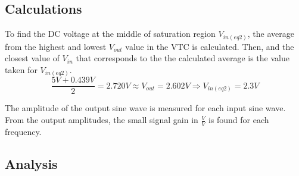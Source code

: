 \subsection{Calculations}

\FloatBarrier

\begin{table}[h!]
	\centering
	\caption{Figure (\ref{fig:part2_vtc}) Data}
	\label{tab:part2_vtc}
\end{table}

\FloatBarrier

To find the DC voltage at the middle of saturation region $V_{in(eq2)}$, the average from the highest and lowest $V_{out}$ value in the VTC is calculated.
Then, and the closest value of $V_{in}$ that corresponds to the the calculated average is the value taken for $V_{in(eq2)}$. \\

\begin{equation}
	\label{eq:v_in_eq2}
	\frac{5 V + 0.439 V}{2} = 2.720 V \approx V_{out} = 2.602 V \Rightarrow V_{in(eq2)} = 2.3 V
\end{equation}

The amplitude of the output sine wave is measured for each input sine wave. 
From the output amplitudes, the small signal gain in $\frac{V}{V}$ is found for each frequency.

\FloatBarrier

\begin{table}[h!]
	\centering
	\caption{Gain of Common Source Amplifier}
	\label{tab:gain_part2}
\end{table}

\FloatBarrier

\begin{table}[h!]
	\centering
	\caption{Gain of Common Source Amplifier with $10$ \si{\milli\volt} Higher Bias}
	\label{tab:gain_part2_plus}
\end{table}

\FloatBarrier

\subsection{Analysis}

\FloatBarrier

